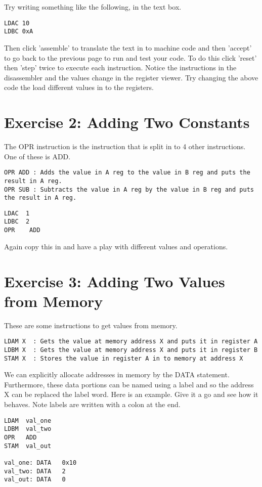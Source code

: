 \documentclass[10pt,a4paper]{article}
\begin{document}
Try writing something like the following, in the text box.
\begin{lstlisting}[frame=single]
LDAC 10
LDBC 0xA
\end{lstlisting}
Then click 'assemble' to translate the text in to machine code and then 'accept' to go back to the previous page to run and test your code. To do this click 'reset' then 'step' twice to execute each instruction. Notice the instructions in the disassembler and the values change in the register viewer. Try changing the above code the load different values in to the registers.

\section{Exercise 2: Adding Two Constants}

The OPR instruction is the instruction that is split in to 4 other instructions. One of these is ADD. 

\begin{verbatim}
OPR ADD	: Adds the value in A reg to the value in B reg and puts the result in A reg.
OPR SUB	: Subtracts the value in A reg by the value in B reg and puts the result in A reg.
\end{verbatim}

\begin{lstlisting}[frame=single]
LDAC  1
LDBC  2
OPR    ADD
\end{lstlisting}

Again copy this in and have a play with different values and operations.

\section{Exercise 3: Adding Two Values from Memory}

These are some instructions to get values from memory.

\begin{verbatim}
LDAM X	: Gets the value at memory address X and puts it in register A
LDBM X	: Gets the value at memory address X and puts it in register B
STAM X	: Stores the value in register A in to memory at address X
\end{verbatim}

We can explicitly allocate addresses in memory by the DATA statement. Furthermore, these data portions can be named using a label and so the address X can be replaced the label word. Here is an example. Give it a go and see how it behaves. Note labels are written with a colon at the end.
\\
\begin{lstlisting}[frame=single]
LDAM  val_one
LDBM  val_two
OPR   ADD
STAM  val_out

val_one: DATA   0x10
val_two: DATA   2
val_out: DATA   0
\end{lstlisting}
\end{document}

